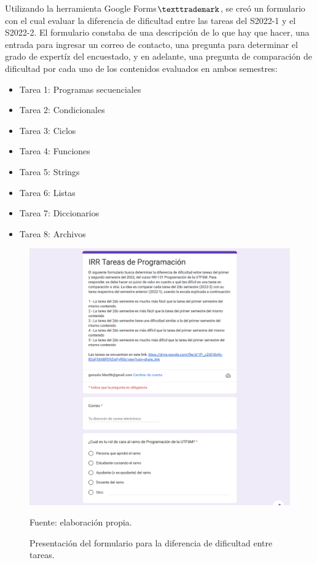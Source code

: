 \documentclass[letterpaper,12pt]{article}
\begin{document}
Utilizando la herramienta Google Forms$\texttrademark$, se creó un formulario con el cual evaluar la diferencia de dificultad entre las tareas del S2022-1 y el S2022-2. El formulario constaba de una descripción de lo que hay que hacer, una entrada para ingresar un correo de contacto, una pregunta para determinar el grado de expertíz del encuestado, y en adelante, una pregunta de comparación de dificultad por cada uno de los contenidos evaluados en ambos semestres:
\begin{itemize}
  \item Tarea 1: Programas secuenciales
  \item Tarea 2: Condicionales
  \item Tarea 3: Ciclos
  \item Tarea 4: Funciones
  \item Tarea 5: Strings
  \item Tarea 6: Listas
  \item Tarea 7: Diccionarios
  \item Tarea 8: Archivos
\end{itemize}
\begin{figure}[H]
  \centering
  \includegraphics[width=1\textwidth]{figures/formulario1.png}
  \caption{Presentación del formulario para la diferencia de dificultad entre tareas.} Fuente: elaboración propia.
  \label{formulario1}
\end{figure}
\end{document}
